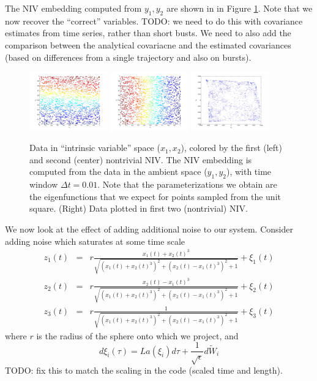 \documentclass[12pt]{article}
\begin{document}
The NIV embedding computed from $y_1, y_2$ are shown in in Figure  \ref{fig:xdata_NIV}.
%
Note that we now recover the ``correct'' variables.
%
TODO: we need to do this with covariance estimates from time series, rather than short busts. We need to also add the comparison between the analytical covariacne and the estimated covariances (based on differences from a single trajectory and also on bursts). 

\begin{figure}[H]
\includegraphics[width=0.3\textwidth]{xdata_colored_NIV1}
\includegraphics[width=0.3\textwidth]{xdata_colored_NIV2}
\includegraphics[width=0.3\textwidth]{embedding_NIV}
\caption{Data in ``intrinsic variable'' space ($x_1, x_2$), colored by the first (left) and second (center) nontrivial NIV. The NIV embedding is computed from the data in the ambient space ($y_1, y_2$), with time window $\Delta t = 0.01$. Note that the parameterizations we obtain are the eigenfunctions that we expect for points sampled from the unit square. (Right) Data plotted in first two (nontrivial) NIV.}
\label{fig:xdata_NIV}
\end{figure}

We now look at the effect of adding additional noise to our system.
%
Consider adding noise which saturates at some time scale
\begin{eqnarray}
z_1(t) & = & r\frac{x_1(t) + x_2(t)^3}{\sqrt{(x_1(t)+x_2(t)^3)^2 + (x_2(t)-x_1(t)^3)^2+1}} + \xi_1(t) \\
z_2(t) & = & r\frac{x_2(t) - x_1(t)^3}{\sqrt{(x_1(t)+x_2(t)^3)^2 + (x_2(t)-x_1(t)^3)^2+1}} + \xi_2(t) \\
z_3(t) & = & r\frac{1}{\sqrt{(x_1(t)+x_2(t)^3)^2 + (x_2(t)-x_1(t)^3)^2+1}} + \xi_3(t)
\end{eqnarray}
%
where $r$ is the radius of the sphere onto which we project, and
\begin{equation}
d \xi_i(\tau) = L a(\xi_i) d\tau + \frac{1}{\sqrt{\epsilon}} d\tilde{W}_i
\end{equation}
TODO: fix this to match the scaling in the code (scaled time and length). 
\end{document}
